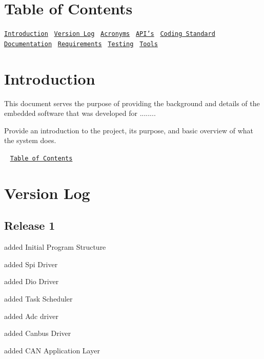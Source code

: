 \label{_Contents}%
 \hypertarget{index_contents_sec}{}\section{Table of Contents}\label{index_contents_sec}
\href{#Introduction}{\tt Introduction}~\newline
 \href{#VersionLog}{\tt Version Log}~\newline
 \href{#Acronyms}{\tt Acronyms}~\newline
 \href{#API}{\tt A\+P\+I's}~\newline
 \href{#CodingStandard}{\tt Coding Standard}~\newline
 \href{#Documentation}{\tt Documentation}~\newline
 \href{#Requirements}{\tt Requirements}~\newline
 \href{#Testing}{\tt Testing}~\newline
 \href{#Tools}{\tt Tools}~\newline






\label{_Introduction}%
 \hypertarget{index_intro_sec}{}\section{Introduction}\label{index_intro_sec}
This document serves the purpose of providing the background and details of the embedded software that was developed for ........

Provide an introduction to the project, its purpose, and basic overview of what the system does.



~\newline
\href{#Contents}{\tt Table of Contents}~\newline






\label{_VersionLog}%
\hypertarget{index_Version}{}\section{Version Log}\label{index_Version}
\hypertarget{index_Release1}{}\subsection{Release 1}\label{index_Release1}

\begin{DoxyItemize}
\item added Initial Program Structure
\item added Spi Driver
\item added Dio Driver
\item added Task Scheduler
\item added Adc driver
\item added Canbus Driver
\item added C\+A\+N Application Layer
\end{DoxyItemize}

